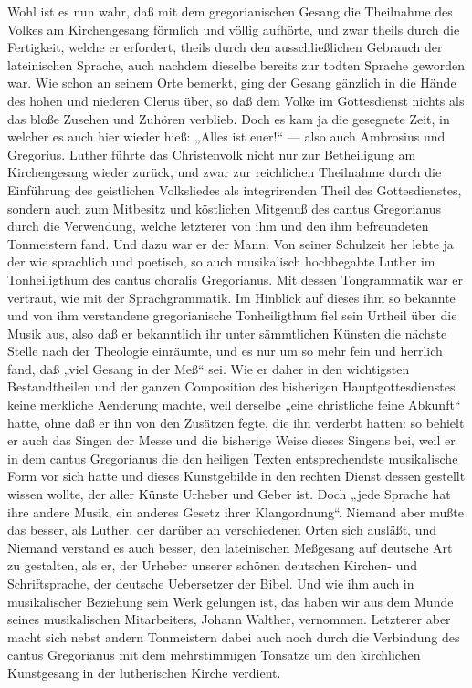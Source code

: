 Wohl ist es nun wahr, daß mit dem gregorianischen Gesang die Theilnahme des Volkes am Kirchengesang förmlich und völlig aufhörte, und zwar theils durch die Fertigkeit, welche er erfordert, theils durch den ausschließlichen Gebrauch der lateinischen Sprache, auch nachdem dieselbe bereits zur todten Sprache geworden war. Wie schon an seinem Orte bemerkt, ging der Gesang gänzlich in die Hände des hohen und niederen Clerus über, so daß dem Volke im Gottesdienst nichts als das bloße Zusehen und Zuhören verblieb. Doch es kam ja die gesegnete Zeit, in welcher es auch hier wieder hieß: „Alles ist euer!“ — also auch Ambrosius und Gregorius. Luther führte das Christenvolk nicht nur zur Betheiligung am Kirchengesang wieder zurück, und zwar zur reichlichen Theilnahme durch die Einführung des geistlichen Volksliedes als integrirenden Theil des Gottesdienstes, sondern auch zum Mitbesitz und köstlichen Mitgenuß des cantus Gregorianus durch die Verwendung, welche letzterer von ihm und den ihm befreundeten Tonmeistern fand. Und dazu war er der Mann. Von seiner Schulzeit her lebte ja der wie sprachlich und poetisch, so auch musikalisch hochbegabte Luther im Tonheiligthum des cantus choralis Gregorianus. Mit dessen Tongrammatik war er vertraut, wie mit der Sprachgrammatik. Im Hinblick auf dieses ihm so bekannte und von ihm verstandene gregorianische Tonheiligthum fiel sein Urtheil über die Musik aus, also daß er bekanntlich ihr unter sämmtlichen Künsten die nächste Stelle nach der Theologie einräumte, und es nur um so mehr fein und herrlich fand, daß „viel Gesang in der Meß“ sei. Wie er daher in den wichtigsten Bestandtheilen und der ganzen Composition des bisherigen Hauptgottesdienstes keine merkliche Aenderung machte, weil derselbe „eine christliche feine Abkunft“ hatte, ohne daß er ihn von den Zusätzen fegte, die ihn verderbt hatten: so behielt er auch das Singen der Messe und die bisherige Weise dieses Singens bei, weil er in dem cantus Gregorianus die den heiligen Texten entsprechendste musikalische Form vor sich
hatte und dieses Kunstgebilde in den rechten Dienst dessen gestellt wissen wollte, der aller Künste Urheber und Geber ist. Doch „jede Sprache hat ihre andere Musik, ein anderes Gesetz ihrer Klangordnung“. Niemand aber mußte das besser, als Luther, der darüber an verschiedenen Orten sich ausläßt, und Niemand verstand es auch besser, den lateinischen Meßgesang auf deutsche Art zu gestalten, als er, der Urheber unserer schönen deutschen Kirchen- und Schriftsprache, der deutsche Uebersetzer der Bibel. Und wie ihm auch in musikalischer Beziehung sein Werk gelungen ist, das haben wir aus dem Munde seines musikalischen Mitarbeiters, Johann Walther, vernommen. Letzterer aber macht sich nebst andern Tonmeistern dabei auch noch durch die Verbindung des cantus Gregorianus mit dem mehrstimmigen Tonsatze um den kirchlichen Kunstgesang in der lutherischen Kirche verdient.

